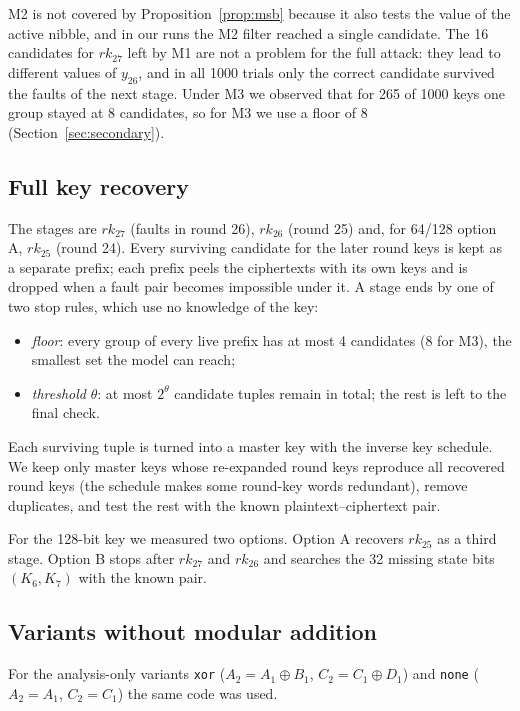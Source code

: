 \documentclass[11pt,a4paper]{article}
\newcommand{\rk}{\mathit{rk}}
\begin{document}
M2 is not covered by Proposition~\ref{prop:msb} because it also tests the value of the active
nibble, and in our runs the M2 filter reached a single candidate. The 16 candidates for
$\rk_{27}$ left by M1 are not a problem for the full attack: they lead to different values of
$y_{26}$, and in all 1000 trials only the correct candidate survived the faults of the next stage.
Under M3 we observed that for 265 of 1000 keys one group stayed at 8 candidates, so for M3 we
use a floor of 8 (Section~\ref{sec:secondary}).

\subsection{Full key recovery}

The stages are $\rk_{27}$ (faults in round 26), $\rk_{26}$ (round 25) and, for 64/128 option A,
$\rk_{25}$ (round 24). Every surviving candidate for the later round keys is kept as a separate
prefix; each prefix peels the ciphertexts with its own keys and is dropped when a fault pair
becomes impossible under it. A stage ends by one of two stop rules, which use no knowledge of
the key:
\begin{itemize}
\item \emph{floor}: every group of every live prefix has at most 4 candidates (8 for M3), the
smallest set the model can reach;
\item \emph{threshold} $\theta$: at most $2^\theta$ candidate tuples remain in total; the rest is
left to the final check.
\end{itemize}
Each surviving tuple is turned into a master key with the inverse key schedule. We keep only
master keys whose re-expanded round keys reproduce all recovered round keys (the schedule makes
some round-key words redundant), remove duplicates, and test the rest with the known
plaintext--ciphertext pair.

For the 128-bit key we measured two options. Option A recovers $\rk_{25}$ as a third stage.
Option B stops after $\rk_{27}$ and $\rk_{26}$ and searches the 32 missing state bits
$(K_6,K_7)$ with the known pair.

\subsection{Variants without modular addition}

For the analysis-only variants \texttt{xor} ($A_2 = A_1\oplus B_1$, $C_2=C_1\oplus D_1$) and
\texttt{none} ($A_2=A_1$, $C_2=C_1$) the same code was used.
\end{document}
